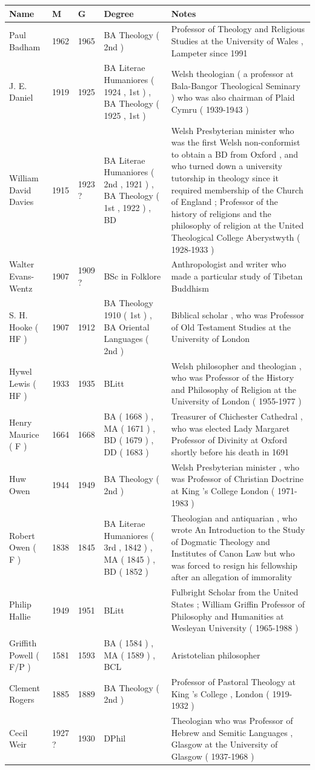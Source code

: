 \documentclass{article}
\begin{document}
\begin{tabular}{lllll}
\toprule
Name & M & G & Degree & Notes \\
\midrule
Paul Badham & 1962 & 1965 & BA Theology ( 2nd ) & Professor of Theology and Religious Studies at the University of Wales , Lampeter since 1991 \\
J. E. Daniel & 1919 & 1925 & BA Literae Humaniores ( 1924 , 1st ) , BA Theology ( 1925 , 1st ) & Welsh theologian ( a professor at Bala-Bangor Theological Seminary ) who was also chairman of Plaid Cymru ( 1939-1943 ) \\
William David Davies & 1915 & 1923 ? & BA Literae Humaniores ( 2nd , 1921 ) , BA Theology ( 1st , 1922 ) , BD & Welsh Presbyterian minister who was the first Welsh non-conformist to obtain a BD from Oxford , and who turned down a university tutorship in theology since it required membership of the Church of England ; Professor of the history of religions and the philosophy of religion at the United Theological College Aberystwyth ( 1928-1933 ) \\
Walter Evans-Wentz & 1907 & 1909 ? & BSc in Folklore & Anthropologist and writer who made a particular study of Tibetan Buddhism \\
S. H. Hooke ( HF ) & 1907 & 1912 & BA Theology 1910 ( 1st ) , BA Oriental Languages ( 2nd ) & Biblical scholar , who was Professor of Old Testament Studies at the University of London \\
Hywel Lewis ( HF ) & 1933 & 1935 & BLitt & Welsh philosopher and theologian , who was Professor of the History and Philosophy of Religion at the University of London ( 1955-1977 ) \\
Henry Maurice ( F ) & 1664 & 1668 & BA ( 1668 ) , MA ( 1671 ) , BD ( 1679 ) , DD ( 1683 ) & Treasurer of Chichester Cathedral , who was elected Lady Margaret Professor of Divinity at Oxford shortly before his death in 1691 \\
Huw Owen & 1944 & 1949 & BA Theology ( 2nd ) & Welsh Presbyterian minister , who was Professor of Christian Doctrine at King 's College London ( 1971-1983 ) \\
Robert Owen ( F ) & 1838 & 1845 & BA Literae Humaniores ( 3rd , 1842 ) , MA ( 1845 ) , BD ( 1852 ) & Theologian and antiquarian , who wrote An Introduction to the Study of Dogmatic Theology and Institutes of Canon Law but who was forced to resign his fellowship after an allegation of immorality \\
Philip Hallie & 1949 & 1951 & BLitt & Fulbright Scholar from the United States ; William Griffin Professor of Philosophy and Humanities at Wesleyan University ( 1965-1988 ) \\
Griffith Powell ( F/P ) & 1581 & 1593 & BA ( 1584 ) , MA ( 1589 ) , BCL & Aristotelian philosopher \\
Clement Rogers & 1885 & 1889 & BA Theology ( 2nd ) & Professor of Pastoral Theology at King 's College , London ( 1919-1932 ) \\
Cecil Weir & 1927 ? & 1930 & DPhil & Theologian who was Professor of Hebrew and Semitic Languages , Glasgow at the University of Glasgow ( 1937-1968 ) \\
\bottomrule
\end{tabular}
\end{document}
